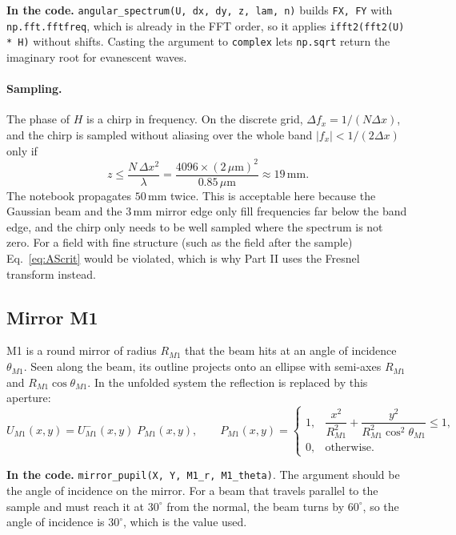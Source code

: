 \documentclass[11pt,a4paper]{article}
\newcommand{\um}{\,\mu\mathrm{m}}
\newcommand{\mm}{\,\mathrm{mm}}
\newcommand{\code}[1]{\texttt{\small #1}}
\newcommand{\incode}[1]{\par\smallskip\noindent\colorbox{black!6}{\parbox{\dimexpr\linewidth-2\fboxsep}{\small\textbf{In the code.} #1}}\par\smallskip}
\begin{document}
\incode{\code{angular\_spectrum(U, dx, dy, z, lam, n)} builds
\code{FX, FY} with \code{np.fft.fftfreq}, which is already in the FFT order, so
it applies \code{ifft2(fft2(U) * H)} without shifts. Casting the argument to
\code{complex} lets \code{np.sqrt} return the imaginary root for evanescent
waves.}

\paragraph{Sampling.}
The phase of $H$ is a chirp in frequency. On the discrete grid,
$\Delta f_x = 1/(N\Delta x)$, and the chirp is sampled without aliasing over
the whole band $|f_x| < 1/(2\Delta x)$ only if
\begin{equation}
  z \le \frac{N\,\Delta x^2}{\lambda}
  = \frac{4096\times(2\um)^2}{0.85\um} \approx 19\mm .
  \label{eq:AScrit}
\end{equation}
The notebook propagates $50\mm$ twice. This is acceptable here because the
Gaussian beam and the $3\mm$ mirror edge only fill frequencies far below the
band edge, and the chirp only needs to be well sampled where the spectrum is
not zero. For a field with fine structure (such as the field after the sample)
Eq.~\eqref{eq:AScrit} would be violated, which is why Part II uses the Fresnel
transform instead.

\subsection{Mirror M1}
\label{sec:mirror}

M1 is a round mirror of radius $R_{M1}$ that the beam hits at an angle of
incidence $\theta_{M1}$. Seen along the beam, its outline projects onto an
ellipse with semi-axes $R_{M1}$ and $R_{M1}\cos\theta_{M1}$. In the unfolded
system the reflection is replaced by this aperture:
\begin{equation}
  U_{M1}(x,y) = U_{M1}^-(x,y)\;P_{M1}(x,y),\qquad
  P_{M1}(x,y) = \begin{cases} 1, & \dfrac{x^2}{R_{M1}^2} + \dfrac{y^2}{R_{M1}^2\cos^2\theta_{M1}} \le 1,\\[4pt] 0, & \text{otherwise.}\end{cases}
\end{equation}

\incode{\code{mirror\_pupil(X, Y, M1\_r, M1\_theta)}. The argument should be
the angle of incidence on the mirror. For a beam that travels parallel to the
sample and must reach it at $30^\circ$ from the normal, the beam turns by
$60^\circ$, so the angle of incidence is $30^\circ$, which is the value used.}
\end{document}
